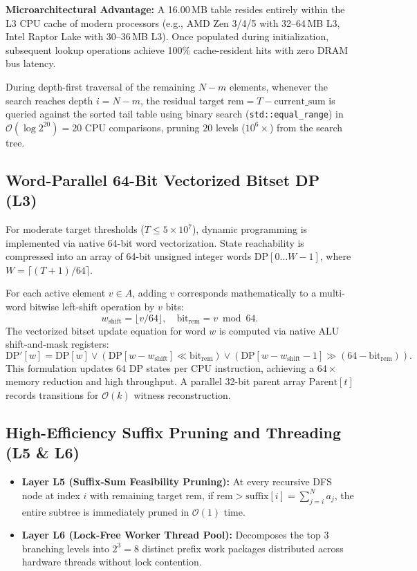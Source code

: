 \documentclass[journal,onecolumn,11pt]{IEEEtran}
\begin{document}
\textbf{Microarchitectural Advantage:} A 16.00\,MB table resides entirely within the L3 CPU cache of modern processors (e.g., AMD Zen 3/4/5 with 32--64\,MB L3, Intel Raptor Lake with 30--36\,MB L3). Once populated during initialization, subsequent lookup operations achieve 100\% cache-resident hits with zero DRAM bus latency.

During depth-first traversal of the remaining $N - m$ elements, whenever the search reaches depth $i = N - m$, the residual target $\text{rem} = T - \text{current\_sum}$ is queried against the sorted tail table using binary search (\texttt{std::equal\_range}) in $\mathcal{O}(\log 2^{20}) = 20$ CPU comparisons, pruning $20$ levels ($10^6\times$) from the search tree.

\subsection{Word-Parallel 64-Bit Vectorized Bitset DP (L3)}
For moderate target thresholds ($T \le 5 \times 10^7$), dynamic programming is implemented via native 64-bit word vectorization. State reachability is compressed into an array of 64-bit unsigned integer words $\text{DP}[0 \dots W-1]$, where $W = \lceil (T + 1)/64 \rceil$.

For each active element $v \in A$, adding $v$ corresponds mathematically to a multi-word bitwise left-shift operation by $v$ bits:
\begin{equation}
    w_{\text{shift}} = \lfloor v / 64 \rfloor, \quad \text{bit}_{\text{rem}} = v \bmod 64.
\end{equation}
The vectorized bitset update equation for word $w$ is computed via native ALU shift-and-mask registers:
\begin{equation}
    \text{DP}'[w] = \text{DP}[w] \lor (\text{DP}[w - w_{\text{shift}}] \ll \text{bit}_{\text{rem}}) \lor (\text{DP}[w - w_{\text{shift}} - 1] \gg (64 - \text{bit}_{\text{rem}})).
    \label{eq:bitset_transition}
\end{equation}
This formulation updates 64 DP states per CPU instruction, achieving a $64\times$ memory reduction and high throughput. A parallel 32-bit parent array $\text{Parent}[t]$ records transitions for $\mathcal{O}(k)$ witness reconstruction.

\subsection{High-Efficiency Suffix Pruning and Threading (L5 \& L6)}
\begin{itemize}
    \item \textbf{Layer L5 (Suffix-Sum Feasibility Pruning):} At every recursive DFS node at index $i$ with remaining target $\text{rem}$, if $\text{rem} > \text{suffix}[i] = \sum_{j=i}^N a_j$, the entire subtree is immediately pruned in $\mathcal{O}(1)$ time.
    \item \textbf{Layer L6 (Lock-Free Worker Thread Pool):} Decomposes the top $3$ branching levels into $2^3 = 8$ distinct prefix work packages distributed across hardware threads without lock contention.
\end{itemize}
\end{document}
